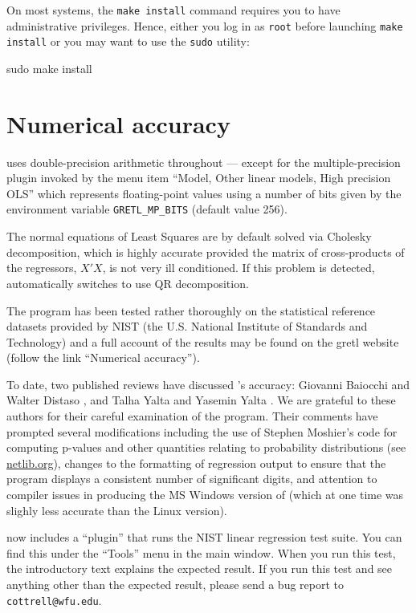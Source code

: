 On most systems, the \texttt{make install} command requires you to
have administrative privileges.  Hence, either you log in as
\texttt{root} before launching \texttt{make install} or you may want
to use the \texttt{sudo} utility:
\begin{code}
sudo make install
\end{code}


\chapter{Numerical accuracy}
\label{app-accuracy}

 uses double-precision arithmetic throughout --- except for
the multiple-precision plugin invoked by the menu item ``Model, Other
linear models, High precision OLS'' which represents floating-point
values using a number of bits given by the environment variable
\verb+GRETL_MP_BITS+ (default value 256).  

The normal equations of Least Squares are by default solved via
Cholesky decomposition, which is highly accurate provided the matrix
of cross-products of the regressors, $X'X$, is not very ill
conditioned.  If this problem is detected,  automatically
switches to use QR decomposition.

The program has been tested rather thoroughly on the statistical
reference datasets provided by NIST (the U.S.  National Institute of
Standards and Technology) and a full account of the results may be
found on the gretl website (follow the link ``Numerical accuracy'').

To date, two published reviews have discussed 's accuracy:
Giovanni Baiocchi and Walter Distaso \citeyearpar{baiocchi03}, and
Talha Yalta and Yasemin Yalta \citeyearpar{yalta07}.  We are grateful
to these authors for their careful examination of the program.  Their
comments have prompted several modifications including the use of
Stephen Moshier's  code for computing p-values and other
quantities relating to probability distributions (see
\href{http://www.netlib.org/cephes/}{netlib.org}), changes to the
formatting of regression output to ensure that the program displays a
consistent number of significant digits, and attention to compiler
issues in producing the MS Windows version of  (which at
one time was slighly less accurate than the Linux version).

 now includes a ``plugin'' that runs the NIST linear
regression test suite.  You can find this under the ``Tools'' menu in
the main window.  When you run this test, the introductory text
explains the expected result.  If you run this test and see anything
other than the expected result, please send a bug report to
\verb+cottrell@wfu.edu+.


